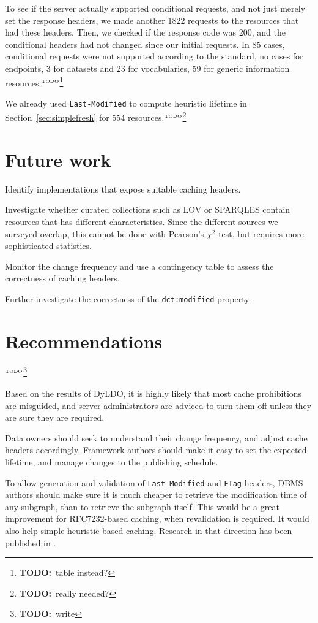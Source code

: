 \documentclass{llncs}
\newcommand{\rdfterm}[1]{\texttt{#1}}
\newcommand{\httph}[1]{\texttt{#1}}
\newcommand{\todo}[1]{\ensuremath{^{\textrm{\tiny{TODO}\normalsize}}}\footnote{\textbf{TODO:}~#1}}
\begin{document}
To see if the server actually supported conditional requests, and not
just merely set the response headers, we made another 1822 requests to
the resources that had these headers. Then, we checked if the response
code was 200, and the conditional headers had not changed since our
initial requests. In 85 cases, conditional requests were not supported
according to the standard, no cases for endpoints, 3 for datasets and
23 for vocabularies, 59 for generic information resources.\todo{table instead?}


We already used \httph{Last-Modified} to compute heuristic lifetime
in Section~\ref{sec:simplefresh} for 554 resources.\todo{really needed?}



\section{Future work}

Identify implementations that expose suitable caching headers.

Investigate whether curated collections such as LOV or SPARQLES
contain resources that has different characteristics. Since the
different sources we surveyed overlap, this cannot be done with
Pearson's $\chi^2$ test, but requires more sophisticated statistics.

Monitor the change frequency and use a contingency table to assess the
correctness of caching headers.

Further investigate the correctness of the \rdfterm{dct:modified} property.

\section{Recommendations}\todo{write}

Based on the results of DyLDO, it is highly likely that most cache
prohibitions are misguided, and server administrators are adviced to
turn them off unless they are sure they are required.

Data owners should seek to understand their change frequency, and
adjust cache headers accordingly. Framework authors should make it
easy to set the expected lifetime, and manage changes to the
publishing schedule.

To allow generation and validation of \httph{Last-Modified} and
\httph{ETag} headers, DBMS authors should make sure it is much cheaper
to retrieve the modification time of any subgraph, than to retrieve
the subgraph itself. This would be a great improvement for
RFC7232-based caching, when revalidation is required. It would also
help simple heuristic based caching. Research in that direction has
been published in \cite{kaseicache}.
\end{document}
